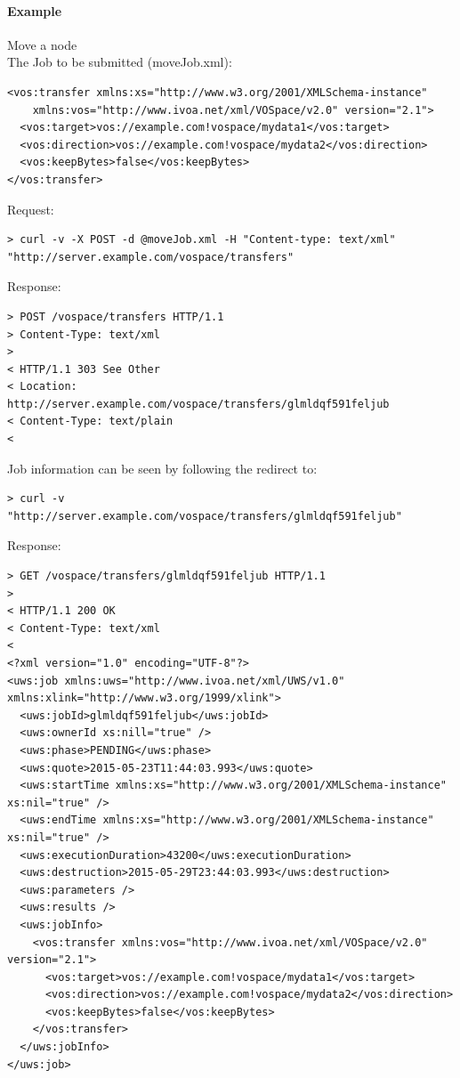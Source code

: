 \documentclass[11pt,a4paper]{ivoa}
\begin{document}
\paragraph{Example}
Move a node
\\[5px]
\noindent
The Job to be submitted (moveJob.xml):
\begin{lstlisting}
<vos:transfer xmlns:xs="http://www.w3.org/2001/XMLSchema-instance"
    xmlns:vos="http://www.ivoa.net/xml/VOSpace/v2.0" version="2.1">
  <vos:target>vos://example.com!vospace/mydata1</vos:target>
  <vos:direction>vos://example.com!vospace/mydata2</vos:direction>
  <vos:keepBytes>false</vos:keepBytes>
</vos:transfer>
\end{lstlisting}
Request:
\begin{lstlisting}
> curl -v -X POST -d @moveJob.xml -H "Content-type: text/xml" "http://server.example.com/vospace/transfers"
\end{lstlisting}
Response:
\begin{lstlisting}
> POST /vospace/transfers HTTP/1.1
> Content-Type: text/xml
>
< HTTP/1.1 303 See Other
< Location: http://server.example.com/vospace/transfers/glmldqf591feljub
< Content-Type: text/plain
<
\end{lstlisting}
Job information can be seen by following the redirect to:
\begin{lstlisting}
> curl -v "http://server.example.com/vospace/transfers/glmldqf591feljub"
\end{lstlisting}
Response:
\begin{lstlisting}
> GET /vospace/transfers/glmldqf591feljub HTTP/1.1
>
< HTTP/1.1 200 OK
< Content-Type: text/xml
<
<?xml version="1.0" encoding="UTF-8"?>
<uws:job xmlns:uws="http://www.ivoa.net/xml/UWS/v1.0" xmlns:xlink="http://www.w3.org/1999/xlink">
  <uws:jobId>glmldqf591feljub</uws:jobId>
  <uws:ownerId xs:nill="true" />
  <uws:phase>PENDING</uws:phase>
  <uws:quote>2015-05-23T11:44:03.993</uws:quote>
  <uws:startTime xmlns:xs="http://www.w3.org/2001/XMLSchema-instance" xs:nil="true" />
  <uws:endTime xmlns:xs="http://www.w3.org/2001/XMLSchema-instance" xs:nil="true" />
  <uws:executionDuration>43200</uws:executionDuration>
  <uws:destruction>2015-05-29T23:44:03.993</uws:destruction>
  <uws:parameters />
  <uws:results />
  <uws:jobInfo>
    <vos:transfer xmlns:vos="http://www.ivoa.net/xml/VOSpace/v2.0" version="2.1">
      <vos:target>vos://example.com!vospace/mydata1</vos:target>
      <vos:direction>vos://example.com!vospace/mydata2</vos:direction>
      <vos:keepBytes>false</vos:keepBytes>
    </vos:transfer>
  </uws:jobInfo>
</uws:job>
\end{lstlisting}
\end{document}
